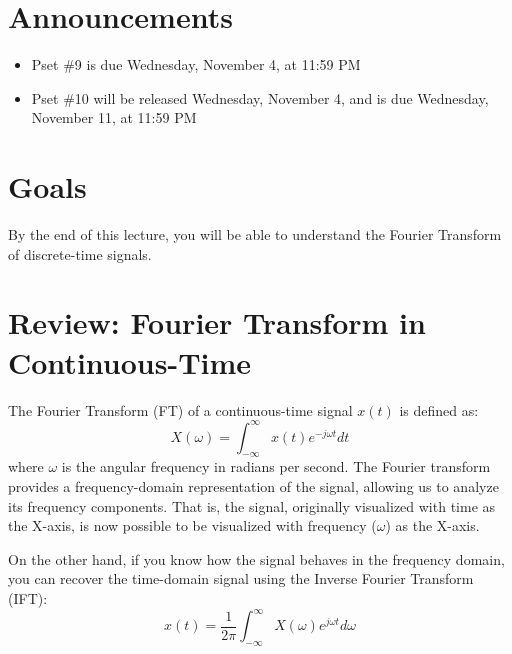 \section{Announcements}
\begin{itemize}
    \item Pset \#9 is due Wednesday, November 4, at 11:59 PM 
    \item Pset \#10 will be released Wednesday, November 4, and is due Wednesday,
    November 11, at 11:59 PM 
\end{itemize}
\section{Goals}
By the end of this lecture, you will be able to understand the Fourier Transform of discrete-time signals.

\section{Review: Fourier Transform in Continuous-Time}
The Fourier Transform (FT) of a continuous-time signal \( x(t) \) is defined as:
\[
X(\omega) = \int_{-\infty}^{\infty} x(t) e^{-j \omega t} dt
\]
where \( \omega \) is the angular frequency in radians per second. The Fourier transform provides a frequency-domain representation of the signal, allowing us to analyze its frequency components. That is, the signal, originally visualized with time as the X-axis, is now possible to be visualized with frequency ($\omega$) as the X-axis.

On the other hand, if you know how the signal behaves in the frequency domain, you can recover the time-domain signal using the Inverse Fourier Transform (IFT):
\[
x(t) = \frac{1}{2\pi} \int_{-\infty}^{\infty} X(\omega) e^{j \omega t} d\omega
\]
